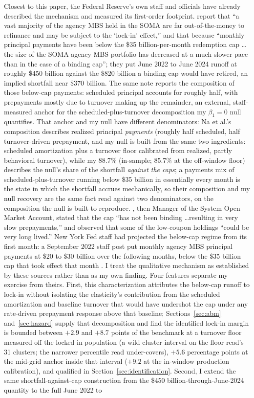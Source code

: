 \documentclass[12pt]{article}
\begin{document}
Closest to this paper, the Federal Reserve's own staff and officials have already described the mechanism and measured its first-order footprint. \citet{na2024} report that ``a vast majority of the agency MBS held in the SOMA are far out-of-the-money to refinance and may be subject to the `lock-in' effect,'' and that because ``monthly principal payments have been below the \$35 billion-per-month redemption cap \ldots the size of the SOMA agency MBS portfolio has decreased at a much slower pace than in the case of a binding cap''; they put June 2022 to June 2024 runoff at roughly \$450 billion against the \$820 billion a binding cap would have retired, an implied shortfall near \$370 billion. The same note reports the composition of those below-cap payments: scheduled principal accounts for roughly half, with prepayments mostly due to turnover making up the remainder, an external, staff-measured anchor for the scheduled-plus-turnover decomposition my $\beta_1 = 0$ null quantifies. That anchor and my null have different denominators: Na et al.'s composition describes realized principal \emph{payments} (roughly half scheduled, half turnover-driven prepayment, and my null is built from the same two ingredients: scheduled amortization plus a turnover floor calibrated from realized, partly behavioral turnover), while my 88.7\% (in-sample; 85.7\% at the off-window floor) describes the null's share of the shortfall \emph{against the caps}; a payments mix of scheduled-plus-turnover running below \$35 billion in essentially every month is the state in which the shortfall accrues mechanically, so their composition and my null recovery are the same fact read against two denominators, on the composition the null is built to reproduce. \citet{perli2024}, then Manager of the System Open Market Account, stated that the cap ``has not been binding \ldots resulting in very slow prepayments,'' and \citet{hammack2025} observed that some of the low-coupon holdings ``could be very long lived.'' New York Fed staff had projected the below-cap regime from its first month: a September 2022 staff post put monthly agency MBS principal payments at \$20 to \$30 billion over the following months, below the \$35 billion cap that took effect that month \citep{nyfed2022}. I treat the qualitative mechanism as established by these sources rather than as my own finding. Four features separate my exercise from theirs. First, this characterization attributes the below-cap runoff to lock-in without isolating the elasticity's contribution from the scheduled amortization and baseline turnover that would have undershot the cap under any rate-driven prepayment response above that baseline; Sections~\ref{sec:abm} and~\ref{sec:hazard} supply that decomposition and find the identified lock-in margin is bounded between $+2.9$ and $+8.7$ points of the benchmark at a turnover floor measured off the locked-in population (a wild-cluster interval on the floor read's 31 clusters; the narrower percentile read under-covers), $+5.6$ percentage points at the mid-grid anchor inside that interval ($+9.2$ at the in-window production calibration), and qualified in Section~\ref{sec:identification}. Second, I extend the same shortfall-against-cap construction from the \$450 billion-through-June-2024 quantity to the full June 2022 to 
\end{document}
